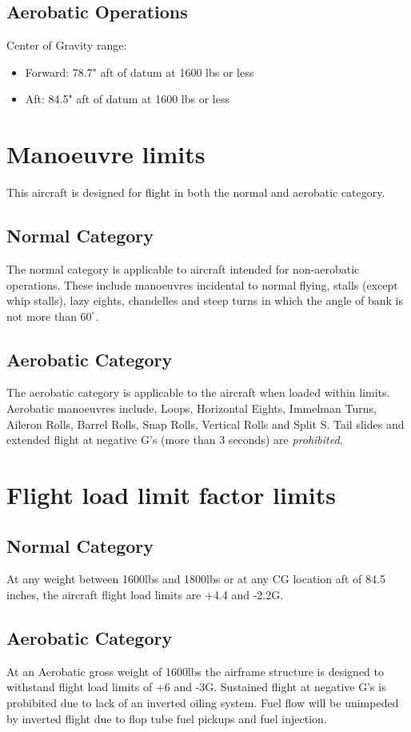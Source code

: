 \subsection{Aerobatic Operations}
Center of Gravity range:
\begin{itemize}
\item{Forward:} 78.7" aft of datum at 1600 lbs or less
\item{Aft:} 84.5" aft of datum at 1600 lbs or less
\end{itemize}

\section{Manoeuvre limits}
This aircraft is designed for flight in both the normal and aerobatic category.
\subsection{Normal Category}
The normal category is applicable to aircraft intended for non-aerobatic operations.  These include manoeuvres incidental to normal flying, stalls (except whip stalls), lazy eights, chandelles and steep turns in which the angle of bank is not more than $60^{\circ}$.

\subsection{Aerobatic Category}
The aerobatic category is applicable to the aircraft when loaded within limits.  Aerobatic 
manoeuvres include, Loops, Horizontal Eights, Immelman Turns, Aileron Rolls, Barrel Rolls, 
Snap Rolls, Vertical Rolls and Split S. Tail slides and extended flight at negative G's 
(more than 3 seconds) are {\em prohibited}.

\section{Flight load limit factor limits}
\subsection{Normal Category}
At any weight between 1600lbs and 1800lbs or at any CG location aft of 84.5 inches, the aircraft 
flight load limits are +4.4 and -2.2G.

\subsection{Aerobatic Category}
At an Aerobatic gross weight of 1600lbs the airframe structure is designed to withstand 
flight load limits of +6 and -3G. Sustained flight at negative G's is probibited due to lack
of an inverted oiling system. Fuel flow will be unimpeded by inverted flight due to flop tube
fuel pickups and fuel injection.  

